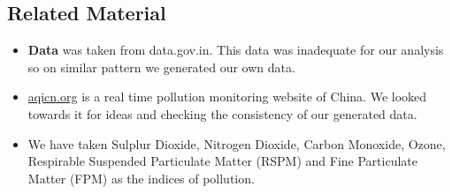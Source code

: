 \documentclass[twocolumn]{article}
\newcommand{\comment}[1]{}
\begin{document}
\subsection{Related Material}
\begin{itemize}
\item \textbf{Data} was taken from data.gov.in. This data was inadequate for our analysis so on similar pattern we generated our own data.
\item \url{aqicn.org} is a real time pollution monitoring website of China. We looked towards it for ideas and checking the consistency of our generated data.
\item We have taken Sulplur Dioxide, Nitrogen Dioxide, Carbon Monoxide, Ozone, Respirable Suspended Particulate Matter (RSPM) and Fine Particulate Matter (FPM) as the indices of pollution.
\end{itemize}

\comment{

Can also comment out paragraphs, etc.

}
\end{document}

